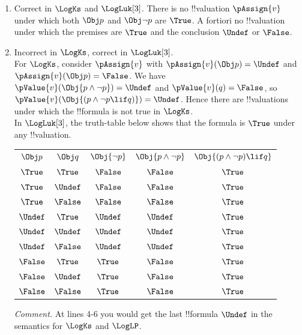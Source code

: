 \documentclass[../../../../include/open-logic-section]{subfiles}
\begin{document}
\begin{prob}[Validity]
\begin{ans}
\begin{enumerate}
\item Correct in $\LogKs$ and $\LogLuk[3]$. There is no !!{valuation}
	$\pAssign{v}$ under which both $\Obj p$ and $\Obj \lnot p$ are 
	$\True$. A fortiori no !!{valuation} under which the premises are 
	$\True$ and the conclusion $\Undef$ or $\False$.
\item Incorrect in $\LogKs$, correct in $\LogLuk[3]$.\\
	For $\LogKs$, consider $\pAssign{v}$ with 
	$\pAssign{v}(\Obj p)=\Undef$ and $\pAssign{v}(\Obj p)=\False$. 
	We have $\pValue{v}(\Obj{p \land \lnot p})=\Undef$ and 
	$\pValue{v}(q)=\False$, so 
	$\pValue{v}(\Obj{(p \land \lnot p \lif q)})=\Undef$. Hence there
	are !!{valuation}s under which the !!{formula} is not true in $\LogKs$.\\
	In $\LogLuk[3]$, the truth-table below shows that the formula
	is $\True$ under any !!{valuation}.
	\begin{center}
	\begin{tabular}{|cc|ccc|}
	\hline
	$\Obj p$	&	$\Obj q$	&	$\Obj{\lnot p}$ &	$\Obj{p \land \lnot p}$	&	$\Obj{(p \land \lnot p) \lif q}$ \\
	$\True$		&	$\True$		& 	$\False$		&		$\False$ 			&	$\True$ \\
	$\True$		&	$\Undef$ 	&	$\False$		& 		$\False$ 			&	$\True$ \\
	$\True$		&	$\False$ 	&	$\False$		& 		$\False$ 			&	$\True$ \\
	$\Undef$	&	$\True$		&	$\Undef$		& 		$\Undef$  			&	$\True$ \\
	$\Undef$	&	$\Undef$ 	&	$\Undef$		& 		$\Undef$ 			&	$\True$ \\
	$\Undef$	&	$\False$ 	&	$\Undef$		& 		$\Undef$ 			&	$\True$ \\
	$\False$	&	$\True$		&	$\True$			& 		$\False$ 			&	$\True$ \\
	$\False$	&	$\Undef$ 	&	$\True$			& 		$\False$ 			&	$\True$ \\
	$\False$	&	$\False$ 	&	$\True$			& 		$\False$ 			&	$\True$ \\
	\hline
	\end{tabular}
	\end{center}
	\emph{Comment.} At lines 4-6 you would get the last !!{formula} $\Undef$ in the semantics
	for $\LogKs$ and $\LogLP$.
\end{enumerate}
\end{ans}
\end{prob}
\end{document}
